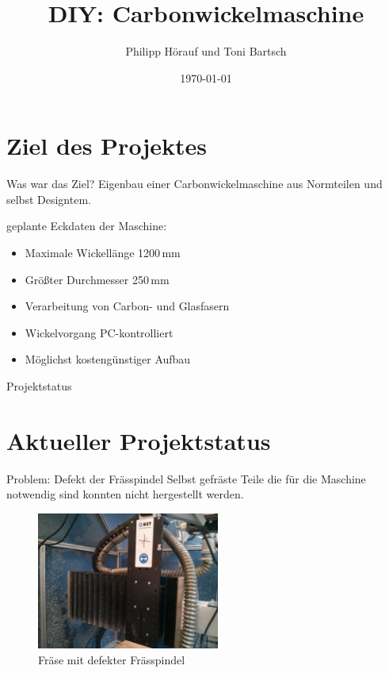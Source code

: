 \documentclass[12pt]{beamer}
\author{Philipp Hörauf und Toni Bartsch}
\title{DIY: Carbonwickelmaschine}
\date{\today}
\begin{document}
\begin{frame}
\titlepage
\end{frame}


\begin{frame}
\tableofcontents
\end{frame}

\section{Ziel des Projektes}
\begin{frame}{Was war das Ziel?}
Eigenbau einer Carbonwickelmaschine aus Normteilen und selbst Designtem.\newline
\vspace{0.5cm}


geplante Eckdaten der Maschine:
\begin{itemize}
	\item Maximale Wickellänge 1200\,mm
	\item Größter Durchmesser 250\,mm
	\item Verarbeitung von Carbon- und Glasfasern
	\item Wickelvorgang PC-kontrolliert
	\item Möglichst kostengünstiger Aufbau
\end{itemize}

\end{frame}


\begin{frame}{Projektstatus}
\section{Aktueller Projektstatus}
Problem: Defekt der Frässpindel\newline
Selbst gefräste Teile die für die Maschine notwendig sind konnten nicht hergestellt werden.

\begin{figure}
	\includegraphics[width=6cm]{bilder/fraese_defekt.jpg}
	\caption{Fräse mit defekter Frässpindel}
\end{figure}

\end{frame}
\end{document}
